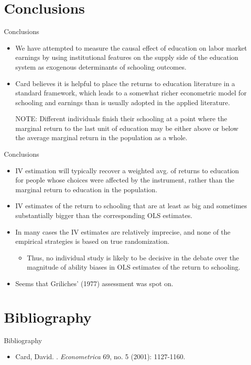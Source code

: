 \documentclass{beamer}
\begin{document}
\section{Conclusions}
\begin{frame}{Conclusions}
   \begin{itemize}
       \item We have attempted to measure the causal effect of education on labor market earnings by using institutional features on the supply side of the education system as exogenous determinants of schooling outcomes. 
       \item Card believes it is helpful to place the returns to education literature in a standard  framework, which leads to a somewhat richer econometric model for schooling and earnings than is usually adopted in the applied literature.
       \begin{block}{NOTE: }
       Different individuals finish their schooling at a point where the marginal return to the last unit of education may be either above or below the average marginal return in the population as a whole.
       
       \end{block}
   \end{itemize} 
\end{frame}


\begin{frame}{Conclusions}
   \begin{itemize}
       \item IV estimation will typically recover a weighted avg. of returns to education for people whose choices were affected by the instrument, rather than the marginal return to education in the population. 
       \item IV estimates of the return to schooling that are at least as big and sometimes substantially bigger than the corresponding OLS estimates.
       \item In many cases the IV estimates are relatively imprecise, and none of the empirical strategies is based on true randomization. 
       \begin{itemize}
           \item Thus, no individual study is likely to be decisive in the debate over the magnitude of ability biases in OLS estimates of the return to schooling.
       \end{itemize}
       \item Seems that Griliches' (1977) assessment was spot on.
   \end{itemize} 
   
\end{frame}
\section{Bibliography}
\begin{frame}{Bibliography}
    \begin{itemize}
        \item Card, David. . \textit{Econometrica} 69, no. 5 (2001): 1127-1160.
    \end{itemize}
\end{frame}
\end{document}
